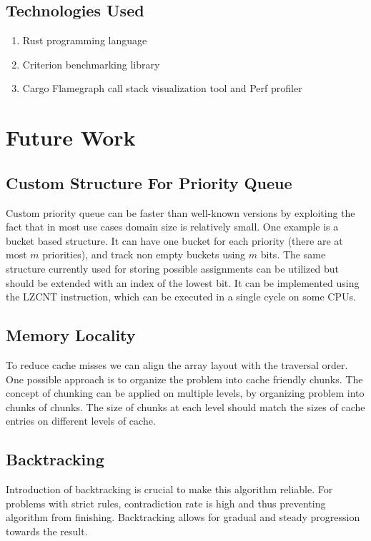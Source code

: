 \documentclass[shortabstract, english, inz]{iithesis}
\begin{document}
\section{Technologies Used}
\begin{enumerate}
    \item Rust programming language
    \item Criterion benchmarking library
    \item Cargo Flamegraph call stack visualization tool and Perf profiler
\end{enumerate}

\chapter{Future Work}
\label{chapter6}
\section{Custom Structure For Priority Queue}
\label{prioritybuckets}
Custom priority queue can be faster than well-known versions by exploiting the fact that in most use cases domain size is relatively small. One example is a bucket based structure. It can have one bucket for each priority (there are at most \(m\) priorities), and track non empty buckets using \(m\) bits. The same structure currently used for storing possible assignments can be utilized but should be extended with an index of the lowest bit. It can be implemented using the LZCNT instruction, which can be executed in a single cycle on some CPUs.


\section{Memory Locality}
\label{chunks}
To reduce cache misses we can align the array layout with the traversal order. One possible approach is to organize the problem into cache friendly chunks. The concept of chunking can be applied on multiple levels, by organizing problem into chunks of chunks. The size of chunks at each level should match the sizes of cache entries on different levels of cache.


\section{Backtracking}
Introduction of backtracking is crucial to make this algorithm reliable. For problems with strict rules, contradiction rate is high and thus preventing algorithm from finishing. Backtracking allows for gradual and steady progression towards the result.
\end{document}
